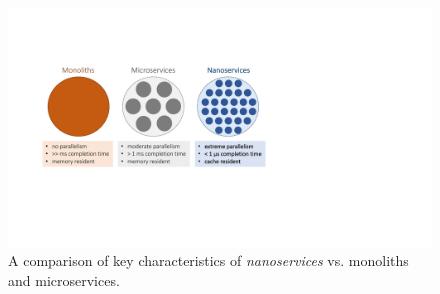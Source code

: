 \begin{figure}
  \includegraphics[width=0.9\linewidth]{./figures/app-frameworks}
  \caption{A comparison of key characteristics of {\em nanoservices} vs. monoliths and microservices.}
  \label{fig:app-frameworks}
\end{figure}
